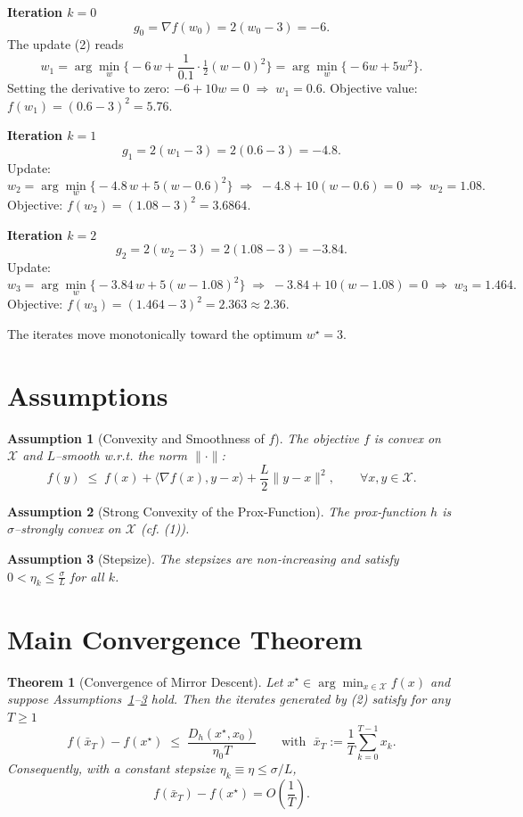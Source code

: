 \documentclass{article}
\newtheorem{theorem}{Theorem}
\newtheorem{assumption}{Assumption}
\begin{document}
\medskip
\noindent\textbf{Iteration $k=0$}
\[
g_{0}= \nabla f(w_{0}) = 2(w_{0}-3) = -6.
\]
The update (2) reads
\[
w_{1}= \arg\min_{w}\Big\{-6\,w+\frac{1}{0.1}\cdot \tfrac12 (w-0)^{2}\Big\}
      = \arg\min_{w}\Big\{-6w+5w^{2}\Big\}.
\]
Setting the derivative to zero: $-6+10w=0\;\Rightarrow\;w_{1}=0.6$.
Objective value: $f(w_{1})=(0.6-3)^{2}=5.76$.

\medskip
\noindent\textbf{Iteration $k=1$}
\[
g_{1}=2(w_{1}-3)=2(0.6-3)=-4.8.
\]
Update:
\[
w_{2}= \arg\min_{w}\Big\{-4.8\,w+5(w-0.6)^{2}\Big\}
      \;\Longrightarrow\; -4.8+10(w-0.6)=0\;\Rightarrow\; w_{2}=1.08.
\]
Objective: $f(w_{2})=(1.08-3)^{2}=3.6864$.

\medskip
\noindent\textbf{Iteration $k=2$}
\[
g_{2}=2(w_{2}-3)=2(1.08-3)=-3.84.
\]
Update:
\[
w_{3}= \arg\min_{w}\Big\{-3.84\,w+5(w-1.08)^{2}\Big\}
      \;\Longrightarrow\; -3.84+10(w-1.08)=0\;\Rightarrow\; w_{3}=1.464.
\]
Objective: $f(w_{3})=(1.464-3)^{2}=2.363\approx2.36$.

The iterates move monotonically toward the optimum $w^{\star}=3$.

\newpage
\section*{Assumptions}
\begin{assumption}[Convexity and Smoothness of $f$]\label{ass:conv-smooth}
The objective $f$ is convex on $\mathcal X$ and $L$–smooth w.r.t. the norm $\|\cdot\|$:
\[
f(y)\;\le\;f(x)+\langle\nabla f(x),y-x\rangle+\frac{L}{2}\|y-x\|^{2},
\qquad\forall x,y\in\mathcal X. \tag{4}
\]
\end{assumption}

\begin{assumption}[Strong Convexity of the Prox‑Function]\label{ass:h-strong}
The prox‑function $h$ is $\sigma$–strongly convex on $\mathcal X$ (cf. (1)).
\end{assumption}

\begin{assumption}[Stepsize]\label{ass:stepsize}
The stepsizes are non‑increasing and satisfy $0<\eta_{k}\le \frac{\sigma}{L}$ for all $k$.
\end{assumption}

\section*{Main Convergence Theorem}
\begin{theorem}[Convergence of Mirror Descent]\label{thm:md}
Let $x^{\star}\in\arg\min_{x\in\mathcal X}f(x)$ and suppose Assumptions~\ref{ass:conv-smooth}–\ref{ass:stepsize} hold. Then the iterates generated by (2) satisfy for any $T\ge1$
\[
f(\bar x_{T})-f(x^{\star})\;\le\;\frac{D_{h}(x^{\star},x_{0})}{\eta_{0}T}
\qquad\text{with }\;\bar x_{T}:=\frac{1}{T}\sum_{k=0}^{T-1}x_{k}. \tag{5}
\]
Consequently, with a constant stepsize $\eta_{k}\equiv\eta\le\sigma/L$,
\[
f(\bar x_{T})-f(x^{\star}) = O\!\left(\frac{1}{T}\right).
\]
\end{theorem}
\end{document}
